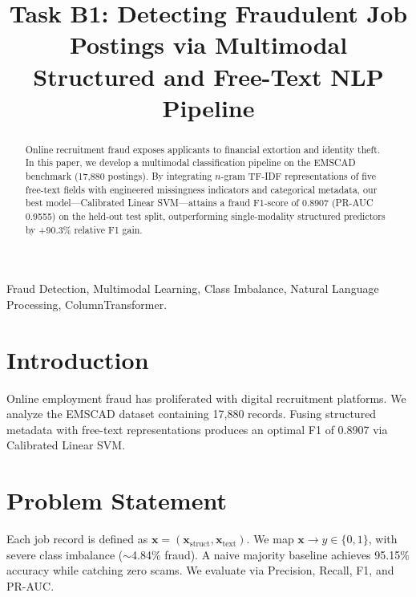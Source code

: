 \documentclass[conference]{IEEEtran}
\begin{document}
\title{Task B1: Detecting Fraudulent Job Postings via Multimodal Structured and Free-Text NLP Pipeline}

\author{
}

\maketitle

\begin{abstract}
Online recruitment fraud exposes applicants to financial extortion and identity theft. In this paper, we develop a multimodal classification pipeline on the EMSCAD benchmark (17,880 postings). By integrating $n$-gram TF-IDF representations of five free-text fields with engineered missingness indicators and categorical metadata, our best model—Calibrated Linear SVM—attains a fraud F1-score of 0.8907 (PR-AUC 0.9555) on the held-out test split, outperforming single-modality structured predictors by +90.3\% relative F1 gain.
\end{abstract}

\begin{IEEEkeywords}
Fraud Detection, Multimodal Learning, Class Imbalance, Natural Language Processing, ColumnTransformer.
\end{IEEEkeywords}

\section{Introduction}
Online employment fraud has proliferated with digital recruitment platforms. We analyze the EMSCAD dataset containing 17,880 records. Fusing structured metadata with free-text representations produces an optimal F1 of 0.8907 via Calibrated Linear SVM.

\section{Problem Statement}
Each job record is defined as $\mathbf{x} = (\mathbf{x}_{\text{struct}}, \mathbf{x}_{\text{text}})$. We map $\mathbf{x} \to y \in \{0, 1\}$, with severe class imbalance ($\sim$4.84\% fraud). A naive majority baseline achieves 95.15\% accuracy while catching zero scams. We evaluate via Precision, Recall, F1, and PR-AUC.
\end{document}
